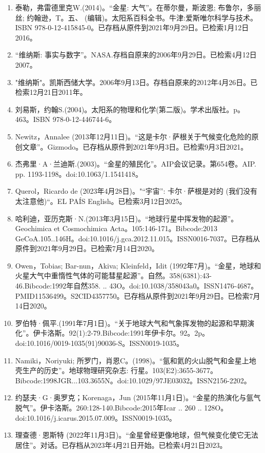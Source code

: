 \begin{enumerate}
\item 泰勒，弗雷德里克W.(2014)。“金星: 大气”。在蒂尔曼，斯波恩; 布鲁尔，多丽丝; 约翰逊，T。五、 (编辑)。太阳系百科全书。牛津:爱斯唯尔科学与技术。ISBN 978-0-12-415845-0。已存档从原件到2021年9月29日。已检索1月12日2016。
\item “维纳斯: 事实与数字”。NASA.存档自原来的2006年9月29日。已检索4月12日2007。
\item "维纳斯"。凯斯西储大学。2006年9月13日。存档自原来的2012年4月26日。已检索12月21日2011年。
\item 刘易斯，约翰S.(2004)。太阳系的物理和化学(第二版)。学术出版社。p。 463。ISBN 978-0-12-446744-6。
\item Newitz，Annalee (2013年12月11日)。“这是卡尔·萨根关于气候变化危险的原创文章”。Gizmodo。已存档从原件到2021年9月3日。已检索9月3日2021。
\item 杰弗里·A·兰迪斯.(2003)。“金星的殖民化”。AIP会议记录。第654卷。AIP. pp. 1193-1198。doi:10.1063/1.1541418。
\item Querol，Ricardo de (2023年4月28日)。"“宇宙”: 卡尔·萨根是对的 (我们没有太注意他)“。EL PAÍS English。已检索3月12日2025。
\item 哈利迪，亚历克斯·N.(2013年3月15日)。“地球行星中挥发物的起源”。Geochimica et Cosmochimica Acta。105:146-171。Bibcode:2013 GeCoA.105..146H。doi:10.1016/j.gca.2012.11.015。ISSN0016-7037。已存档从原件到2021年9月29日。已检索7月14日2020。 
\item Owen，Tobias; Bar-nun，Akiva; Kleinfeld，Idit (1992年7月)。“金星，地球和火星大气中重惰性气体的可能彗星起源”。自然。358(6381):43-46.Bibcode:1992年自然358. .. 43O。doi:10.1038/358043a0。ISSN1476-4687。PMID11536499。S2CID4357750。已存档从原件到2021年9月29日。已检索7月14日2020。   
\item 罗伯特·佩平.(1991年7月1日)。“关于地球大气和气象挥发物的起源和早期演化”。伊卡洛斯。92(1):2-79.Bibcode:1991年伊卡尔。92。2p。doi:10.1016/0019-1035(91)90036-S。ISSN0019-1035。 
\item Namiki，Noriyuki; 所罗门，肖恩C。(1998)。“氩和氦的火山脱气和金星上地壳生产的历史”。地球物理研究杂志: 行星。103(E2):3655-3677。Bibcode:1998JGR...103.3655N。doi:10.1029/97JE03032。ISSN2156-2202。 
\item 约瑟夫·G·奥罗克；Korenaga，Jun (2015年11月1日)。“金星的热演化与氩气脱气”。伊卡洛斯。260:128-140.Bibcode:2015年Icar .. 260 .. 128O。doi:10.1016/j.icarus.2015.07.009。ISSN0019-1035。 
\item 理查德·恩斯特 (2022年11月3日)。“金星曾经更像地球，但气候变化使它无法居住”。对话。已存档从2023年4月21日开始。已检索4月21日2023。

\end{enumerate}
